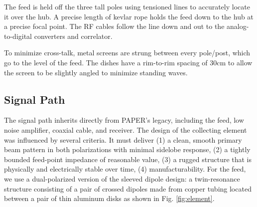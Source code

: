 \documentclass[preprint]{aastex}
\begin{document}
The feed is held off the three tall poles using tensioned lines to accurately locate it over the hub.  A precise 
length of kevlar rope holds the feed down to the hub at a precise focal point.  The RF cables follow the line 
down and out to the analog-to-digital converters and correlator.  

To minimize cross-talk, metal screens are strung between every pole/post, which go to the level of the feed.  
The dishes have a rim-to-rim spacing of 30cm to allow the screen to be slightly angled to minimize standing waves.


\vspace{-0.25in}
\subsection{Signal Path}
\vspace{-6pt}

The signal path inherits directly from PAPER's legacy,
including the feed,  low noise amplifier, coaxial cable, and receiver.  The
design of the collecting element was influenced by several criteria. It must deliver (1) a
clean, smooth primary beam pattern in both polarizations with minimal
sidelobe response, (2) a tightly bounded feed-point impedance of
reasonable value, (3) a rugged structure that is physically and electrically stable
over time, (4) manufacturability. For the feed, we use a dual-polarized
version of the sleeved dipole design: a twin-resonance structure
consisting of a pair of crossed dipoles made from copper tubing
located between a pair of thin aluminum disks \citep{parsons_et_al2010} as
shown in Fig. \ref{fig:element}.
%
\end{document}
